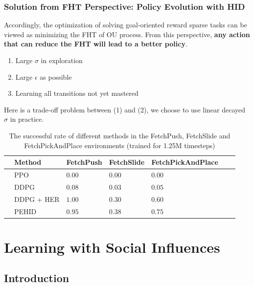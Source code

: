 \documentclass[10pt,hyperref={CJKbookmarks=true},envcountsect,mathserif]{beamer}
\begin{document}
\begin{frame}
	\frametitle{Solution from FHT Perspective: Policy Evolution with HID}
	Accordingly, the optimization of solving goal-oriented reward sparse tasks can be viewed as minimizing the FHT of OU process. From this perspective, \textbf{any action that can reduce the FHT will lead to a better policy}. 

\begin{enumerate}
	\item Large $\sigma$ in exploration
	\item Large $\epsilon$ as possible
	\item Learning all transitions not yet mastered
\end{enumerate}

Here is a trade-off problem between (1) and (2), we choose to use linear decayed $\sigma$ in practice.

	\begin{table}[t]
	\caption{The successful rate of different methods in the FetchPush, FetchSlide and FetchPickAndPlace environments (trained for 1.25M timesteps)}
	\label{tab_successrate}
	\tiny
	\label{text-table}
	\centering
	\begin{tabular}{lllllll}
		\toprule & Method  & FetchPush & FetchSlide &FetchPickAndPlace    \\
		\midrule
		& PPO   & $0.00$  &   $ 0.00$&   $0.00$\\
		& DDPG   & $0.08$  &  $0.03$   &   $0.05$ \\
		& DDPG + HER   & $\bm{1.00}$  &  $0.30$   &   $0.60$ \\
		& PEHID   & $0.95$   &  $\bm{0.38}$ &   $\bm{0.75}$\\
		\bottomrule
	\end{tabular}

	\vspace{-12pt}
\end{table}
\end{frame}


\section{Learning with Social Influences}
\subsection{Introduction}
\end{document}
